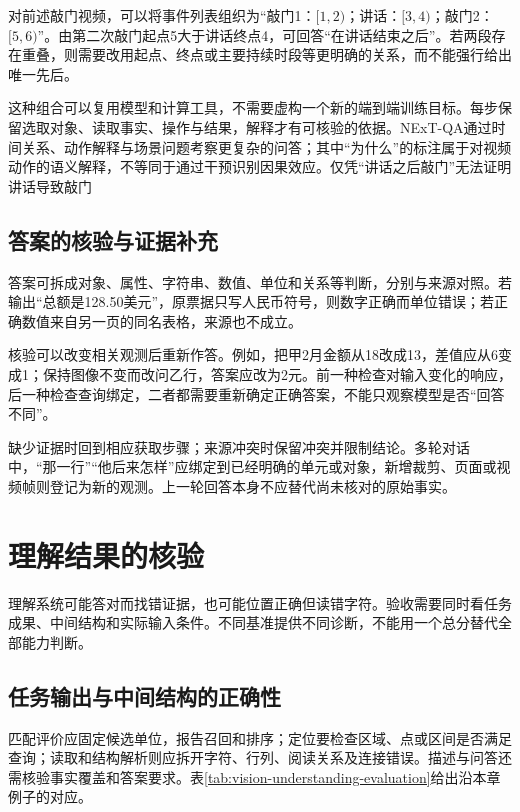 对前述敲门视频，可以将事件列表组织为“敲门1：$[1,2)$；讲话：$[3,4)$；敲门2：$[5,6)$”。由第二次敲门起点5大于讲话终点4，可回答“在讲话结束之后”。若两段存在重叠，则需要改用起点、终点或主要持续时段等更明确的关系，而不能强行给出唯一先后。

这种组合可以复用模型和计算工具，不需要虚构一个新的端到端训练目标。每步保留选取对象、读取事实、操作与结果，解释才有可核验的依据。NExT-QA通过时间关系、动作解释与场景问题考察更复杂的问答；其中“为什么”的标注属于对视频动作的语义解释，不等同于通过干预识别因果效应。仅凭“讲话之后敲门”无法证明讲话导致敲门

\subsection{答案的核验与证据补充}
\label{sec:vision-understanding-answer-check}

答案可拆成对象、属性、字符串、数值、单位和关系等判断，分别与来源对照。若输出“总额是128.50美元”，原票据只写人民币符号，则数字正确而单位错误；若正确数值来自另一页的同名表格，来源也不成立。

核验可以改变相关观测后重新作答。例如，把甲2月金额从18改成13，差值应从6变成1；保持图像不变而改问乙行，答案应改为2元。前一种检查对输入变化的响应，后一种检查查询绑定，二者都需要重新确定正确答案，不能只观察模型是否“回答不同”。

缺少证据时回到相应获取步骤；来源冲突时保留冲突并限制结论。多轮对话中，“那一行”“他后来怎样”应绑定到已经明确的单元或对象，新增裁剪、页面或视频帧则登记为新的观测。上一轮回答本身不应替代尚未核对的原始事实。

\section{理解结果的核验}
\label{sec:vision-understanding-evaluation}

理解系统可能答对而找错证据，也可能位置正确但读错字符。验收需要同时看任务成果、中间结构和实际输入条件。不同基准提供不同诊断，不能用一个总分替代全部能力判断。

\subsection{任务输出与中间结构的正确性}
\label{sec:vision-understanding-output-metrics}

匹配评价应固定候选单位，报告召回和排序；定位要检查区域、点或区间是否满足查询；读取和结构解析则应拆开字符、行列、阅读关系及连接错误。描述与问答还需核验事实覆盖和答案要求。表\ref{tab:vision-understanding-evaluation}给出沿本章例子的对应。


